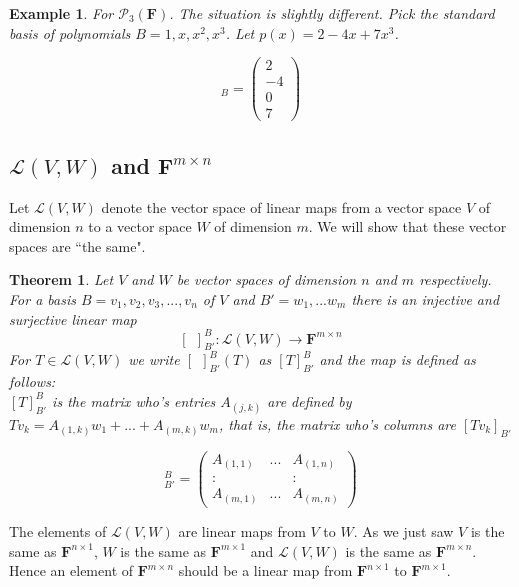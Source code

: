 \documentclass{article}
\theoremstyle{problemstyle}
\newtheorem{theorem}{Theorem}
\newtheorem{example}{Example}
\begin{document}
\begin{example}
For $\mathcal{P}_3(\textbf{F})$. The situation is slightly different. Pick the standard basis of polynomials $B = 1,x,x^2,x^3$. Let $p(x) = 2 -4x + 7x^3$. 

\begin{equation}
 [2 -4x + 7x^3]_B  =
\begin{pmatrix} 2 \\ -4 \\ 0\\ 7 \end{pmatrix}
\end{equation}
\end{example}

\subsection*{$\mathscr{L}(V,W)$ and $\textbf{F}^{m\times n}$}

Let $\mathscr{L}(V,W)$ denote the vector space of linear maps from a vector space $V$ of dimension $n$ to a vector space $W$ of dimension $m$. We will show that these vector spaces are ``the same".  

\begin{theorem}
Let $V$ and $W$ be vector spaces of dimension $n$ and $m$ respectively. For a basis $B = v_1,v_2,v_3,...,v_n$ of $V$ and $B'= w_1,...w_m$ there is an injective and surjective linear map $$[ \ \  ]_{B'}^B: \mathscr{L}(V,W) \rightarrow \textbf{F}^{m \times n}$$ For $T \in \mathscr{L}(V,W)$ we write $[ \ \  ]_{B'}^B(T)$ as $[T]_{B'}^B$ and the map is defined as follows:\\

$[T]_{B'}^B$ is the matrix who's entries $A_{(j,k)}$ are defined by $Tv_k = A_{(1,k)}w_1+...+A_{(m,k)}w_m$, that is, the matrix who's columns are $[Tv_k]_{B'}$

\begin{equation}
[T]_{B'}^B = 
\begin{pmatrix} A_{(1,1)} & ... & A_{(1,n)} \\ : &  & : \\ A_{(m,1)} & ... & A_{(m,n)} \end{pmatrix}
\end{equation}

\end{theorem}

The elements of $\mathscr{L}(V,W)$ are linear maps from $V$ to $W$. As we just saw $V$ is the same as $\textbf{F}^{n\times 1}$, $W$ is the same as $\textbf{F}^{m\times 1}$ and $\mathscr{L}(V,W)$ is the same as $\textbf{F}^{m \times n}$. Hence an element of $\textbf{F}^{m \times n}$ should be a linear map from $\textbf{F}^{n\times 1}$ to $\textbf{F}^{m\times 1}$.\\
\end{document}
